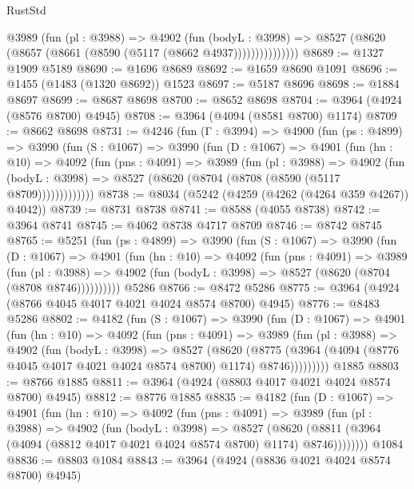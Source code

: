 \begin{lexlean}{RustStd}
\begin{coremodule}
{\begin{coremodule}
{{{{{{{{{{{{{{{{{{{{{{{{{{{{{{{{{{{{{{                @3989
                  (fun (pl : @3988) =>
                  @4902
                    (fun (bodyL : @3998) =>
                    @8527 (@8620 (@8657 (@8661 (@8590 (@5117 (@8662 @4937)))))))))))))))
@8689 := @1327 @1909 @5189
@8690 := @1696 @8689
@8692 := @1659 @8690 @1091
@8696 := @1455 (@1483 (@1320 @8692)) @1523
@8697 := @5187 @8696
@8698 := @1884 @8697
@8699 := @8687 @8698
@8700 := @8652 @8698
@8704 := @3964 (@4924 (@8576 @8700) @4945)
@8708 := @3964 (@4094 (@8581 @8700) @1174)
@8709 := @8662 @8698
@8731 := @4246
    (fun (Γ : @3994) =>
    @4900
      (fun (ps : @4899) =>
      @3990
        (fun (S : @1067) =>
        @3990
          (fun (D : @1067) =>
          @4901
            (fun (hn : @10) =>
            @4092
              (fun (pns : @4091) =>
              @3989
                (fun (pl : @3988) =>
                @4902
                  (fun (bodyL : @3998) =>
                  @8527 (@8620 (@8704 (@8708 (@8590 (@5117 @8709)))))))))))))
@8738 := @8034 (@5242 (@4259 (@4262 (@4264 @359 @4267)) @4042))
@8739 := @8731 @8738
@8741 := @8588 (@4055 @8738)
@8742 := @3964 @8741
@8745 := @4062 @8738 @4717 @8709
@8746 := @8742 @8745
@8765 := @5251
    (fun (ps : @4899) =>
    @3990
      (fun (S : @1067) =>
      @3990
        (fun (D : @1067) =>
        @4901
          (fun (hn : @10) =>
          @4092
            (fun (pns : @4091) =>
            @3989
              (fun (pl : @3988) =>
              @4902 (fun (bodyL : @3998) => @8527 (@8620 (@8704 (@8708 @8746))))))))))
    @5286
@8766 := @8472 @5286
@8775 := @3964 (@4924 (@8766 @4045 @4017 @4021 @4024 @8574 @8700) @4945)
@8776 := @8483 @5286
@8802 := @4182
    (fun (S : @1067) =>
    @3990
      (fun (D : @1067) =>
      @4901
        (fun (hn : @10) =>
        @4092
          (fun (pns : @4091) =>
          @3989
            (fun (pl : @3988) =>
            @4902
              (fun (bodyL : @3998) =>
              @8527
                (@8620
                  (@8775
                    (@3964 (@4094 (@8776 @4045 @4017 @4021 @4024 @8574 @8700) @1174) @8746)))))))))
    @1885
@8803 := @8766 @1885
@8811 := @3964 (@4924 (@8803 @4017 @4021 @4024 @8574 @8700) @4945)
@8812 := @8776 @1885
@8835 := @4182
    (fun (D : @1067) =>
    @4901
      (fun (hn : @10) =>
      @4092
        (fun (pns : @4091) =>
        @3989
          (fun (pl : @3988) =>
          @4902
            (fun (bodyL : @3998) =>
            @8527
              (@8620 (@8811 (@3964 (@4094 (@8812 @4017 @4021 @4024 @8574 @8700) @1174) @8746))))))))
    @1084
@8836 := @8803 @1084
@8843 := @3964 (@4924 (@8836 @4021 @4024 @8574 @8700) @4945)
}}}}}}}}}}}}}}}}}}}}}}}}}}}}}}}}}}}}}}
\end{coremodule}}
\end{coremodule}
\end{lexlean}
